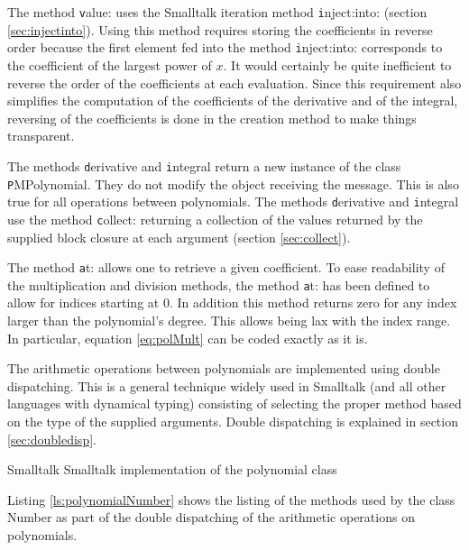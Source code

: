 The method {\texttt value:} uses the Smalltalk iteration method {\texttt
inject:into:} (\cf section \ref{sec:injectinto}). Using this
method requires storing the coefficients in reverse order because
the first element fed into the method {\texttt inject:into:}
corresponds to the coefficient of the largest power of $x$. It
would certainly be quite inefficient to reverse the order of the
coefficients at each evaluation. Since this requirement also
simplifies the computation of the coefficients of the derivative
and of the integral, reversing of the coefficients is done in the
creation method to make things transparent.

The methods {\texttt derivative} and {\texttt integral} return a new
instance of the class {\texttt PMPolynomial}. They do not modify the
object receiving the message. This is also true for all operations
between polynomials. The methods {\texttt derivative} and {\texttt
integral} use the method {\texttt collect:} returning a collection of
the values returned by the supplied block closure at each argument
(\cf section \ref{sec:collect}).

The method {\texttt at:} allows one to retrieve a given coefficient.
To ease readability of the multiplication and division methods,
the method {\texttt at:} has been defined to allow for indices
starting at 0. In addition this method returns zero for any index
larger than the polynomial's degree. This allows being lax with
the index range. In particular, equation \ref{eq:polMult} can be
coded exactly as it is.

The arithmetic operations between polynomials are implemented
using double dispatching. This is a general technique widely used
in Smalltalk (and all other languages with dynamical typing)
consisting of selecting the proper method based on the type of the
supplied arguments. Double dispatching is explained in section
\ref{sec:doubledisp}.


\begin{listing}[label=lst:polynomial]{Smalltalk}
{Smalltalk implementation of the polynomial class}

\end{listing}

Listing \ref{ls:polynomialNumber} shows the listing of the methods
used by the class Number as part of the double dispatching of the
arithmetic operations on polynomials.

